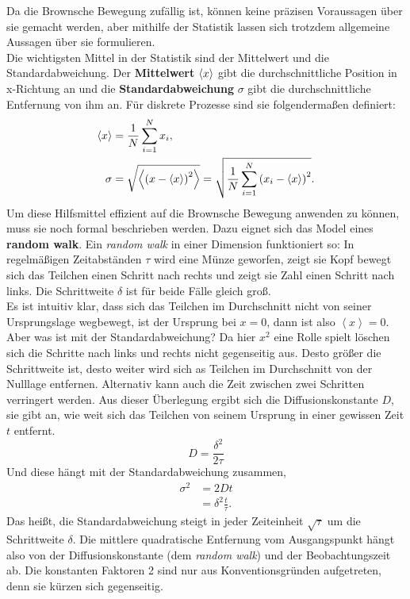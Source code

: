 Da die Brownsche Bewegung zufällig ist, können keine präzisen Voraussagen über sie gemacht werden, aber mithilfe der Statistik lassen sich trotzdem allgemeine Aussagen über sie formulieren.\\
Die wichtigsten Mittel in der Statistik sind der Mittelwert und die Standardabweichung. Der \textbf{Mittelwert} $\left< x \right>$ gibt die durchschnittliche Position in x-Richtung an und die \textbf{Standardabweichung} $\sigma$ gibt die durchschnittliche Entfernung von ihm an. Für diskrete Prozesse sind sie folgendermaßen definiert:
\begin{align}
  \left< x \right> & = \frac{1}{N} \sum_{i=1}^{N} x_i, \\
  \sigma & = \sqrt{\left<  {\left( x - \left< x \right> \right)}^2  \right>} = \sqrt{\frac{1}{N} \sum_{i=1}^{N} {\left( x_i - \left< x \right> \right)}^2}.
\end{align}
Um diese Hilfsmittel effizient auf die Brownsche Bewegung anwenden zu können, muss sie noch formal beschrieben werden. Dazu eignet sich das Model eines \textbf{random walk}. Ein \emph{random walk} in einer Dimension funktioniert so: In regelmäßigen Zeitabständen $\tau$ wird eine Münze geworfen, zeigt sie Kopf bewegt sich das Teilchen einen Schritt nach rechts und zeigt sie Zahl einen Schritt nach links. Die Schrittweite $\delta$ ist für beide Fälle gleich groß.\\
Es ist intuitiv klar, dass sich das Teilchen im Durchschnitt nicht von seiner Ursprungslage wegbewegt, ist der Ursprung bei $x = 0$, dann ist also $\left< x \right> = 0$. Aber was ist mit der Standardabweichung? Da hier $x^2$ eine Rolle spielt löschen sich die Schritte nach links und rechts nicht gegenseitig aus.
Desto größer die Schrittweite ist, desto weiter wird sich as Teilchen im Durchschnitt von der Nulllage entfernen. Alternativ kann auch die Zeit zwischen zwei Schritten verringert werden. Aus dieser Überlegung ergibt sich die Diffusionskonstante $D$, sie gibt an, wie weit sich das Teilchen von seinem Ursprung in einer gewissen Zeit $t$ entfernt.
\begin{equation}
  D = \frac{\delta^2}{2 \tau}
\end{equation}
Und diese hängt mit der Standardabweichung zusammen,
\begin{align}
  \sigma^2 & = 2Dt \label{eq:diff} \\
   & = \delta^2 \frac{t}{\tau}.
\end{align}
Das heißt, die Standardabweichung steigt in jeder Zeiteinheit $\sqrt{\tau}$ um die Schrittweite $\delta$. Die mittlere quadratische Entfernung vom Ausgangspunkt hängt also von der Diffusionskonstante (dem \emph{random walk}) und der Beobachtungszeit ab. Die konstanten Faktoren 2 sind nur aus Konventionsgründen aufgetreten, denn sie kürzen sich gegenseitig.\\


